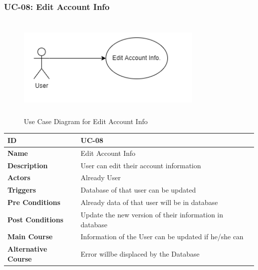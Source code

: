     \subsubsection{UC-08: Edit Account Info}
    \begin{figure}[H]
        \includegraphics[height=5cm, width=0.8\textwidth]{./diagrams/Use Case/u8.png}
        \centering 
        \caption{Use Case Diagram for Edit Account Info}
        \label{fig:Usecase1}
        \end{figure}
        
    \begin{center}
        \begin{tabularx}{\textwidth}{|l|X|}
            \hline
            \textbf{ID} & UC-08 \\
            \hline
            \textbf{Name} & Edit Account Info \\
            \hline
            \textbf{Description} & User can edit their account information \\
            \hline
            \textbf{Actors} & Already User \\
            \hline
            \textbf{Triggers} & Database of that user can be updated \\
            \hline
            \textbf{Pre Conditions} & Already data of that user will be in database  \\
            \hline
            \textbf{Post Conditions} & Update the new version of their information in database \\
            \hline
            \textbf{Main Course} & Information of the User can be updated if he/she can \\
            \hline
            \textbf{Alternative Course} & Error willbe displaced by the Database \\
            \hline
            
        \end{tabularx}
    \end{center}
    \newpage 
    

